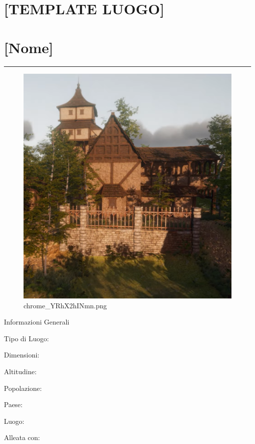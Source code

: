 \section{{[}TEMPLATE LUOGO{]}}\label{template-luogo}

\section{{[}Nome{]}}\label{nome}

\begin{center}\rule{0.5\linewidth}{0.5pt}\end{center}

\begin{figure}
\centering
\includegraphics{chrome_YRhX2hINmn.png}
\caption{chrome\_YRhX2hINmn.png}
\end{figure}

Informazioni Generali

Tipo di Luogo:

Dimensioni:

Altitudine:

Popolazione:

Paese:

Luogo:

Alleata con:

